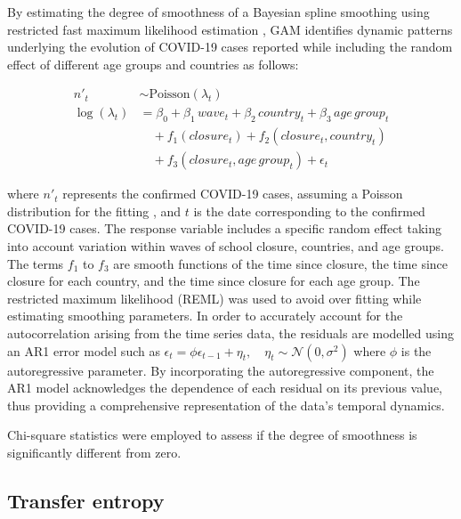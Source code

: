 \documentclass[]{interact}
\theoremstyle{plain}%
\theoremstyle{definition}
\theoremstyle{remark}
\begin{document}
By estimating the degree of smoothness of a Bayesian spline smoothing using restricted fast maximum likelihood estimation \citep{wood2011fast}, GAM identifies dynamic patterns underlying the evolution of COVID-19 cases reported while including the random effect of different age groups and countries as follows:

\begin{align*}
  \tag{1}
  n\prime_t &\sim \text{Poisson}(\lambda_t) \\
  \log(\lambda_t) &= \beta_0 + \beta_1\,wave_t + \beta_2\,country_t + \beta_3\,age\,group_t \\
  &\quad + f_1(closure_t) + f_2(closure_t, country_t) \\
  &\quad + f_3(closure_t, age\,group_t) + \epsilon_t
\end{align*}

\noindent where \(n\prime_t\) represents the confirmed COVID-19 cases, assuming a Poisson distribution for the fitting \citep{loader2006local}, and \(t\) is the date corresponding to the confirmed COVID-19 cases. The response variable includes a specific random effect taking into account variation within waves of school closure, countries, and age groups. The terms \(f_1\) to \(f_3\) are smooth functions of the time since closure, the time since closure for each country, and the time since closure for each age group. The restricted maximum likelihood (REML) was used to avoid over fitting while estimating smoothing parameters. In order to accurately account for the autocorrelation arising from the time series data, the residuals are modelled using an AR1 error model such as \(\epsilon_t = \phi \epsilon_{t-1} + \eta_t, \quad \eta_t \sim \mathcal{N}(0, \sigma^2)\) where \(\phi\) is the autoregressive parameter. By incorporating the autoregressive component, the AR1 model acknowledges the dependence of each residual on its previous value, thus providing a comprehensive representation of the data's temporal dynamics.

Chi-square statistics were employed to assess if the degree of smoothness is significantly different from zero.

\subsection{Transfer entropy}\label{transfer-entropy}
\end{document}
